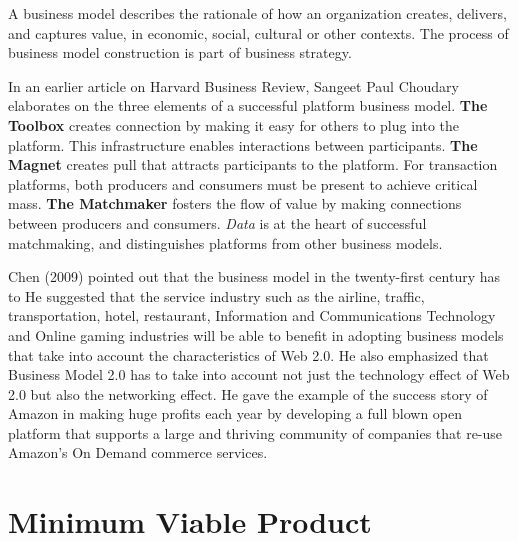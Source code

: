A business model describes the rationale of how an organization creates, delivers, and captures value, in economic, social, cultural or other contexts. The process of business model construction is part of business strategy.

In an earlier article on Harvard Business Review, Sangeet Paul Choudary elaborates on the three elements of a successful platform business model. \textbf{The Toolbox} creates connection by making it easy for others to plug into the platform. This infrastructure enables interactions between participants. \textbf{The Magnet} creates pull that attracts participants to the platform. For transaction platforms, both producers and consumers must be present to achieve critical mass. \textbf{The Matchmaker} fosters the flow of value by making connections between producers and consumers. \emph{Data} is at the heart of successful matchmaking, and distinguishes platforms from other business models.

Chen (2009) pointed out that the business model in the twenty-first century has to  He suggested that the service industry such as the airline, traffic, transportation, hotel, restaurant, Information and Communications Technology and Online gaming industries will be able to benefit in adopting business models that take into account the characteristics of Web 2.0. He also emphasized that Business Model 2.0 has to take into account not just the technology effect of Web 2.0 but also the networking effect. He gave the example of the success story of Amazon in making huge profits each year by developing a full blown open platform that supports a large and thriving community of companies that re-use Amazon’s On Demand commerce services.


\section{Minimum Viable Product}
